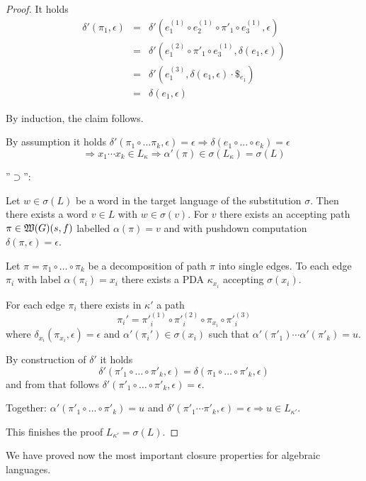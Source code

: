 \begin{proof}
It holds
\begin{eqnarray*}
\delta'(\pi_1, \epsilon) &=& \delta'(e_1^{(1)} \circ e_2^{(1)} \circ \pi'_1
\circ e_3^{(1)}, \epsilon) \\
&=& \delta'(e_1^{(2)} \circ \pi'_1 \circ e_3^{(1)}, \delta(e_1,\epsilon))
\\
&=& \delta'(e_1^{(3)}, \delta(e_1, \epsilon) \cdot {\$}_{e_1}) \\
&=& \delta(e_1, \epsilon)
\end{eqnarray*}

By induction, the claim follows.

By assumption it holds $\delta'(\pi_1 \circ \ldots \pi_k, \epsilon) = \epsilon
\Rightarrow \delta(e_1 \circ \ldots \circ e_k) = \epsilon$ 
\[ \Rightarrow x_1 \cdots x_k \in L_{\kappa} \Rightarrow \alpha'(\pi) \in
\sigma(L_{\kappa}) = \sigma(L) \]

\bigskip
''$\supset$'':

Let $w \in \sigma(L)$ be a word in the target language of the substitution
$\sigma$. Then there exists a word $v \in L$ with $w \in \sigma(v)$. For $v$
there exists an accepting path $\pi \in \mbox{$\mathfrak{W}({G})$}(s, f)$ labelled
$\alpha(\pi) = v$ and with pushdown computation $\delta(\pi, \epsilon) =
\epsilon$.

Let $\pi = \pi_1 \circ\ldots\circ \pi_k$ be a decomposition of path $\pi$ into
single edges. To each edge $\pi_i$ with label $\alpha(\pi_i) = x_i$ there exists
a PDA $\kappa_{x_i}$ accepting $\sigma(x_i)$.

For each edge $\pi_i$ there exists in $\kappa'$ a path 
\[ \pi_i' = {\pi'}_i^{(1)} \circ {\pi'}_i^{(2)} \circ \pi_{x_i} \circ
{\pi'}_i^{(3)} \]
where $\delta_{x_i}(\pi_{x_i}, \epsilon) = \epsilon$ and
$\alpha'(\pi_i') \in \sigma(x_i)$ such that $\alpha'({\pi'}_1) \cdots \alpha'({\pi'}_k) = u$.

By construction of $\delta'$ it holds 
\[ \delta'(\pi'_1 \circ\ldots\circ \pi'_k, \epsilon) = \delta(\pi_1
\circ\ldots\circ \pi'_k, \epsilon) \]
and from that follows $\delta'(\pi'_1 \circ\ldots\circ \pi'_k, \epsilon) =
\epsilon$.

Together: $\alpha'(\pi'_1 \circ\ldots\circ \pi'_k) = u$ and $\delta'(\pi'_1
\cdots \pi'_k, \epsilon) = \epsilon \Rightarrow u \in L_{\kappa'}$.

\medskip
This finishes the proof $L_{\kappa'} = \sigma(L)$.
\end{proof}

\bigskip
We have proved now the most important closure properties for algebraic
languages.

